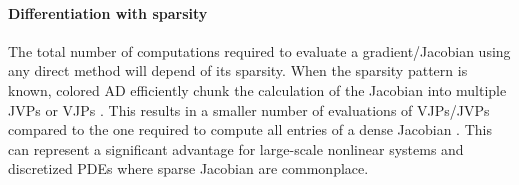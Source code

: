     





\paragraph{Differentiation with sparsity}
\label{section:sparsity}

The total number of computations required to evaluate a gradient/Jacobian using any direct method will depend of its sparsity.  
When the sparsity pattern is known, colored AD efficiently chunk the calculation of the Jacobian into multiple JVPs or VJPs \cite{gebremedhin2005color}. 
This results in a smaller number of evaluations of VJPs/JVPs compared to the one required to compute all entries of a dense Jacobian \cite{pal2024nonlinearsolve}. 
This can represent a significant advantage for large-scale nonlinear systems and discretized PDEs where sparse Jacobian are commonplace.  

